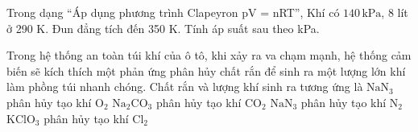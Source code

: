\begin{ex}
Trong dạng “Áp dụng phương trình Clapeyron pV = nRT”, Khí có $140\,\text{kPa}$, 8 lít ở 290 K. Đun đẳng tích đến 350 K. Tính áp suất sau theo kPa.
\end{ex}

\begin{ex}
Trong hệ thống an toàn túi khí của ô tô, khi xảy ra va chạm mạnh, hệ thống cảm biến sẽ kích thích một phản ứng phân hủy chất rắn để sinh ra một lượng lớn khí làm phồng túi nhanh chóng. Chất rắn và lượng khí sinh ra tương ứng là
\choice
{$\mathrm{NaN_3}$ phân hủy tạo khí $\mathrm{O_2}$}
{$\mathrm{Na_2CO_3}$ phân hủy tạo khí $\mathrm{CO_2}$}
{\True $\mathrm{NaN_3}$ phân hủy tạo khí $\mathrm{N_2}$}
{$\mathrm{KClO_3}$ phân hủy tạo khí $\mathrm{Cl_2}$}
\end{ex}

